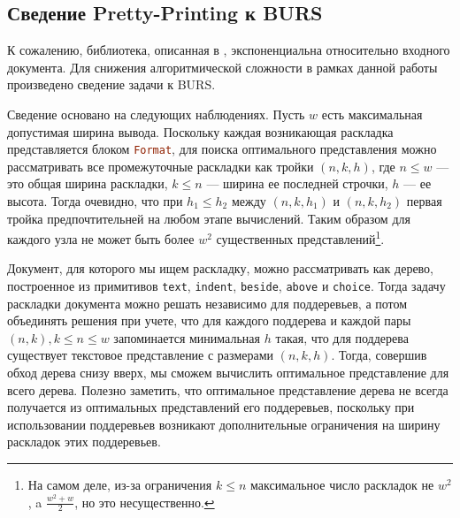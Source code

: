 \subsection{Сведение Pretty-Printing к BURS}
К сожалению, библиотека, описанная в \cite{swierstra}, экспоненциальна
относительно входного документа. Для снижения алгоритмической сложности
в рамках данной работы произведено сведение задачи к BURS.

Сведение основано на следующих наблюдениях. Пусть $w$ есть максимальная допустимая
ширина вывода. Поскольку каждая возникающая раскладка представляется блоком
\lstinline[language=Haskell]{Format}, для поиска оптимального представления можно рассматривать
все промежуточные раскладки
как тройки $(n, k, h)$, где $n \le w$ --- это общая ширина раскладки, $k \le n$ ---
ширина ее последней строчки, $h$ --- ее высота. Тогда очевидно, что при $h_1 \le h_2$
между $(n, k, h_1)$ и $(n, k, h_2)$ первая тройка предпочтительней на любом этапе вычислений.
Таким образом для каждого узла не может быть более $w^2$ существенных представлений\footnote{
На самом деле, из-за ограничения $k \le n$ максимальное число раскладок не $w^2$, a
$\frac{w^2 + w}{2}$, но это несущественно.}.

Документ, для которого мы ищем раскладку, можно рассматривать как дерево, построенное из примитивов
\lstinline[language=Haskell]{text},
\lstinline[language=Haskell]{indent},
\lstinline[language=Haskell]{beside},
\lstinline[language=Haskell]{above} и \lstinline[language=Haskell]{choice}. Тогда задачу
раскладки документа можно решать независимо для поддеревьев, а потом объединять решения
при учете, что для каждого поддерева
и каждой пары $(n, k), k \le n \le w$ запоминается минимальная $h$ такая, что для поддерева существует
текстовое представление с размерами $(n, k, h)$. Тогда, совершив обход дерева снизу вверх, мы сможем
вычислить оптимальное представление для всего дерева. Полезно заметить,
что оптимальное представление дерева не всегда получается из оптимальных представлений его
поддеревьев, поскольку при использовании поддеревьев возникают дополнительные
ограничения на ширину раскладок этих поддеревьев.

